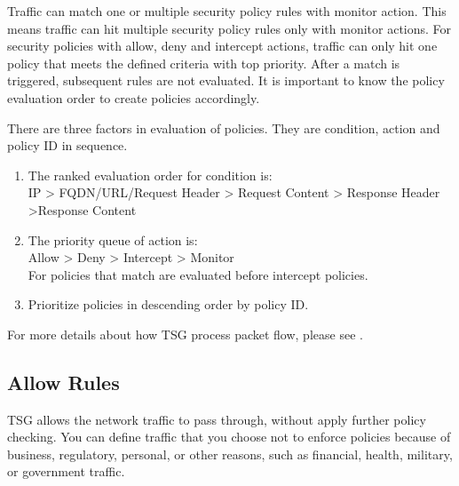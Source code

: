 Traffic can match one or multiple security policy rules with monitor action. This means traffic can hit multiple security policy rules only with monitor actions. 
For security policies with allow, deny and intercept actions, traffic can only hit one policy that meets the defined criteria with top priority. 
After a match is triggered, subsequent rules are not evaluated. It is important to know the policy evaluation order to create policies accordingly. 


There are three factors in evaluation of policies. They are condition, action and policy ID in sequence.


\begin{description}[leftmargin=0pt,itemindent=0em,itemsep=0.5ex]
    \item
    \begin{enumerate}
        \setlength{\topsep}{0pt} %
        \item The ranked evaluation order for condition is:\\
        IP > FQDN/URL/Request Header > Request Content > Response Header >Response Content
        \item The priority queue of action is:\\
        Allow > Deny > Intercept > Monitor\\
        For policies that match \hyperlink{link:SSL Decryption Exclusion}{\color{linkblue}{SSL Decryption Exclusion}} are evaluated before intercept policies.
        \item Prioritize policies in descending order by policy ID. 
    \end{enumerate}
\end{description}


For more details about how TSG process packet flow, please see \textbf{\hyperlink{link:Appendix E TSG Packet Flow}{\color{linkblue}{Appendix E TSG Packet Flow}}}.

\subsection*{\hypertarget{link:Allow Rules}{Allow Rules}}
\label{sec:policies:security:allow}

TSG allows the network traffic to pass through, without apply further policy checking. You can define traffic that you choose not to enforce policies because of business, 
regulatory, personal, or other reasons, such as financial, health, military, or government traffic. 


